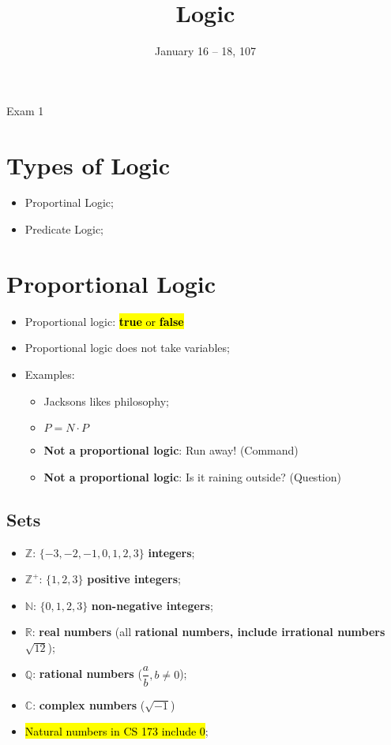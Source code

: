 \documentclass{note}
\date{January 16 -- 18, 107}
\title{Logic}
\begin{document}
    \begin{note}{Exam 1}

        \section{Types of Logic}

        \begin{itemize}
            \item Proportinal Logic;
            \item Predicate Logic;
        \end{itemize}

        \section{Proportional Logic}

        \begin{itemize}
            \item Proportional logic: \hl{\textbf{true} or \textbf{false}}
            \item Proportional logic does not take variables;
            \item Examples:
            \begin{itemize}
                \item Jacksons likes philosophy;
                \item $ P = N \cdot P $
                \item \textbf{Not a proportional logic}: Run away! (Command)
                \item \textbf{Not a proportional logic}: Is it raining outside? (Question)
            \end{itemize}
        \end{itemize}

        \subsection{Sets}

        \begin{itemize}
            \item $ \mathbb{Z} $: $ \{ -3, -2, -1, 0, 1, 2, 3 \} $ \textbf{integers};
            \item $ \mathbb{Z}^{+} $: $ \{1, 2, 3 \} $ \textbf{positive integers};
            \item $ \mathbb{N} $: $ \{0, 1, 2, 3 \} $ \textbf{non-negative integers};
            \item $ \mathbb{R} $: \textbf{real numbers} (all \textbf{rational numbers, include irrational numbers
            $ \sqrt{12} $});
            \item $ \mathbb{Q} $: \textbf{rational numbers} ($ \dfrac{a}{b}, b \ne 0 $);
            \item $ \mathbb{C} $: \textbf{complex numbers} ($ \sqrt{-1} $)
            \item \hl{Natural numbers in CS 173 include 0};
        \end{itemize}


\end{note}
\end{document}

